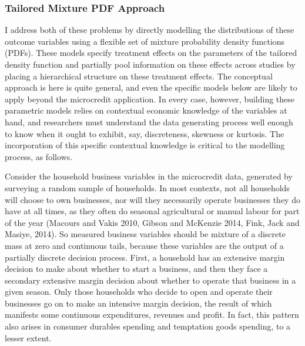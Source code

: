 \documentclass[AER]{AEA}
\begin{document}
\subsubsection{Tailored Mixture PDF Approach}
I address both of these problems by directly modelling the distributions of these outcome variables using a flexible set of mixture probability density functions (PDFs). These models specify treatment effects on the parameters of the tailored density function and partially pool information on these effects across studies by placing a hierarchical structure on these treatment effects. The conceptual approach is here is quite general, and even the specific models below are likely to apply beyond the microcredit application. In every case, however, building these parametric models relies on contextual economic knowledge of the variables at hand, and researchers must understand the data generating process well enough to know when it ought to exhibit, say, discreteness, skewness or kurtosis. The incorporation of this specific contextual knowledge is critical to the modelling process, as follows. 

Consider the household business variables in the microcredit data, generated by surveying a random sample of households. In most contexts, not all households will choose to own businesses, nor will they necessarily operate businesses they do have at all times, as they often do seasonal agricultural or manual labour for part of the year (Macours and Vakis 2010, Gibson and McKenzie 2014, Fink, Jack and Masiye, 2014). So measured business variables should be mixture of a discrete mass at zero and continuous tails, because these variables are the output of a partially discrete decision process. First, a household has an extensive margin decision to make about whether to start a business, and then they face a secondary extensive margin decision about whether to operate that business in a given season. Only those households who decide to open and operate their businesses go on to make an intensive margin decision, the result of which manifests some continuous expenditures, revenues and profit. In fact, this pattern also arises in consumer durables spending and temptation goods spending, to a lesser extent.  
\end{document}
